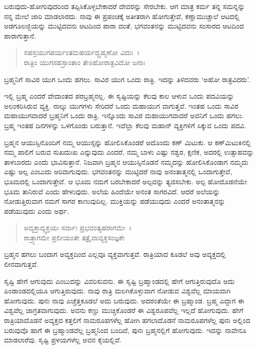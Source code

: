 ಬರುವುದು-ಹೋಗುವುದರಿಂದ ತಪ್ಪಿಸಿಕೊಳ್ಳಬೇಕಾದರೆ ದೇವರನ್ನು ಸೇರಬೇಕು. ಆಗ ಮಾತ್ರ ಕರ್ಮ ತನ್ನ ಸಮನ್ನನ್ನು ನನ್ನ ಮೇಲೆ ಜಾರಿ ಮಾಡಲಾರದು. ನಾವು ಈ ಪ್ರಪಂಚಕ್ಕೆ ಅತೀತರಾಗಿ ಹೋಗುತ್ತೇವೆ, ಕಣ್ಣಾಮುಚ್ಚಾಲೆ ಆಟದಲ್ಲಿ ಅಡಗೂಲಜ್ಜಿಯನ್ನು ಮುಟ್ಟಿದವನು ಆಟದಿಂದ ಪಾರಾ ದಂತೆ, ಭಗವಂತನನ್ನು ಮುಟ್ಟಿದವನು ಸಂಸಾರದ ಆಟದಿಂದ ಪಾರಾಗುತ್ತಾನೆ.

\begin{verse}
ಸಹಸ್ರಯುಗಪರ್ಯಂತಮಹರ್ಯದ್ಬ್ರಹ್ಮಣೋ ವಿದುಃ~।\\ರಾತ್ರಿಂ ಯುಗಸಹಸ್ರಾಂತಾಂ ತೇಽಹೋರಾತ್ರವಿದೋ ಜನಾಃ 
\end{verse}

{\small ಬ್ರಹ್ಮನಿಗೆ ಸಾವಿರ ಯುಗ ಒಂದು ಹಗಲು. ಸಾವಿರ ಯುಗ ಒಂದು ರಾತ್ರಿ. ಇದನ್ನು ತಿಳಿದವರು ‘ಅಹೋ ರಾತ್ರವಿದರು’.}

ಇಲ್ಲಿ ಬ್ರಹ್ಮ ಎಂದರೆ ವೇದಾಂತದ ಪರಬ್ರಹ್ಮನಲ್ಲ. ಈ ಸೃಷ್ಟಿಯನ್ನು ಕೆಲವು ಕಾಲ ಆಳುವ ಒಂದು ಪದವಿಯನ್ನು ಅಲಂಕರಿಸಿರುವ ವ್ಯಕ್ತಿ. ನಾಲ್ಕು ಯುಗಗಳು ಸೇರಿದರೆ ಒಂದು ಮಹಾಯುಗ ವಾಗುತ್ತವೆ. ಇಂತಹ ಒಂದು ಸಾವಿರ ಮಹಾಯುಗವಾದರೆ ಬ್ರಹ್ಮನಿಗೆ ಒಂದು ರಾತ್ರಿ. ಇನ್ನೊಂದು ಸಾವಿರ ಮಹಾಯುಗವಾದರೆ ಅವನಿಗೆ ಒಂದು ಹಗಲು. ಬ್ರಹ್ಮ ಇಂತಹ ದಿನಗಳನ್ನು ಒಳಗೊಂಡು ಬರುತ್ತಾನೆ. ಇವೆಲ್ಲಾ ಕೆಲವು ಮಹಾನ್ ವ್ಯಕ್ತಿಗಳಿಗೆ ಸಿಕ್ಕುವ ಒಂದು ಪದವಿ.

ಬ್ರಹ್ಮನ ಆಯುಸ್ಸಿನೊಂದಿಗೆ ನಮ್ಮ ಆಯುಸ್ಸನ್ನು ಹೋಲಿಸಿಕೊಂಡರೆ ಅದೊಂದು ಕಣ್ ಮಿಟುಕು. ಆ ಕಣ್​ಮಿಟುಕಿನಲ್ಲಿ ನಮ್ಮ ಪಾಲಿಗೆ ಬರುವ ಸುಖದುಃಖ ಎನ್ನುವುದು ಎಂದರೆ, ನಮ್ಮ ಬಾಳು ಎಷ್ಟು ನಶ್ವರ, ಕ್ಷಣಿಕ, ಅದರಲ್ಲಿ ಉತ್ಸಾಹವನ್ನು ತಾಳಬಾರದು ಎಂದು ಭಾವಿಸುತ್ತಾನೆ. ನಿಜವಾಗಿ ಬ್ರಹ್ಮನ ಆಯುಸ್ಸಿನೊಡನೆ ನಮ್ಮದನ್ನು ಹೋಲಿಸಿಕೊಂಡಾಗ ನಮ್ಮದು ಎಷ್ಟು ಅಲ್ಪ ಎಂಬುದು ಅರಿವಾಗುವುದು. ಭಗವಂತನನ್ನು ಮುಟ್ಟಿದರೆ ನಾವು ಅನಂತಾತ್ಮನಲ್ಲಿ ಒಂದಾಗುತ್ತೇವೆ, ಭೂಮದಲ್ಲಿ ಒಂದಾಗುತ್ತೇವೆ. ಆ ಭೂಮ ನಮಗೆ ಬರಬೇಕಾದರೆ ಅಲ್ಪವನ್ನು ತ್ಯಜಿಸಬೇಕು. ಅಲ್ಪ ಹೋದೊಡನೆಯೇ ಭೂಮ ತಾನಿರುವೆ ಎಂದು ಹೇಳುವುದು. ಅಲೆಯ ಹಿಂದೆಯೇ ಅನಂತ ಸಾಗರವಿದೆ. ಆದರೆ ಅಲೆಯನ್ನು ನೋಡುತ್ತಿರುವಾಗ ನಮಗೆ ಸಾಗರ ಕಾಣುವುದಿಲ್ಲ. ಮುಕ್ತಿಯನ್ನು ಪಡೆಯುವುದು ಎಂದರೆ ಅನಂತಾತ್ಮನನ್ನು ಪಡೆಯುವುದು ಎಂದು ಅರ್ಥ.

\begin{verse}
ಅವ್ಯಕ್ತಾದ್ವ್ಯಕ್ತಯಃ ಸರ್ವಾಃ ಪ್ರಭವಂತ್ಯಹರಾಗಮೇ~।\\ರಾತ್ರ್ಯಾಗಮೇ ಪ್ರಲೀಯಂತೇ ತತ್ರೈವಾವ್ಯಕ್ತಸಂಜ್ಞಕೇ 
\end{verse}

{\small ಬ್ರಹ್ಮನ ಹಗಲು ಬಂದಾಗ ಅವ್ಯಕ್ತದಿಂದ ಎಲ್ಲವೂ ವ್ಯಕ್ತವಾಗುತ್ತವೆ. ರಾತ್ರಿಯಾದ ಕೂಡಲೆ ಅವು ಅವ್ಯಕ್ತದಲ್ಲಿ ಲೀನವಾಗುತ್ತವೆ.}

ಸೃಷ್ಟಿ ಹೇಗೆ ಆಗುವುದು ಎಂಬುದನ್ನು ವಿವರಿಸುವನು. ಈ ಸೃಷ್ಟಿ ಬ್ರಹ್ಮಾಂಡದಲ್ಲಿ ಹೇಗೆ ಆಗುತ್ತಿರುವುದೊ ಅದು ಪಿಂಡಾಂಡದಲ್ಲಿಯೂ ಆಗುತ್ತಿರುವುದು. ನಾವು ರಾತ್ರಿ ಮಲಗಿಕೊಳ್ಳುವಾಗ ನೋಡುವ ವಿಶ್ವವೆಲ್ಲ ಮಾಯವಾಗಿ ಹೋಗುವುದು. ಪುನಃ ನಾವು ಎಚ್ಚೆತ್ತಕೂಡಲೆ ಅದು ಬರುವುದು. ಅದರಂತೆಯೇ ಈ ಬ್ರಹ್ಮಾಂಡ. ಬ್ರಹ್ಮ ಎದ್ದಾಗ ಈ ವಿಶ್ವವೆಲ್ಲ ಜಾಗ್ರತವಾಗುವುದು. ಅವನು ಕಣ್ಣು ಮುಚ್ಚಿಕೊಂಡರೆ ಈ ವಿಶ್ವರೂಪವೆಲ್ಲ ಇಲ್ಲದೆ ಹೋಗುವುದು. ಹೇಗೆ ರಾತ್ರಿಯಾದೊಡನೆ ಅವ್ಯಕ್ತದ ಕತ್ತಲಿಗೆ ನಾಮರೂಪಗಳೆಲ್ಲ ಹೋಗಿ ಹಗಲಾದೊಡನೆ ನಾಮರೂಪಗಳೆಲ್ಲ ಪುನಃ ಅಲ್ಲಿಂದ ಬರುವುವೊ ಹಾಗೆ ಈ ಬ್ರಹ್ಮಾಂಡವೆಲ್ಲ ಬ್ರಹ್ಮನಿಂದ ಬಂದಿದೆ, ಪುನಃ ಬ್ರಹ್ಮನಲ್ಲಿಗೆ ಹೋಗುವುದು. ಇದನ್ನು ನಾವೇನೂ ಮಾಡಲಾರೆವು. ಸೃಷ್ಟಿ ಪ್ರಳಯಗಳೆಲ್ಲ ಅವನ ಕೈಯಲ್ಲಿವೆ.

